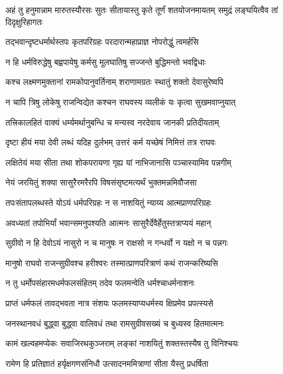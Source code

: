 \threelineshloka
{अहं तु हनुमान्नाम मारुतस्यौरसः सुतः}
{सीतायास्तु कृते तूर्णं शतयोजनमायतम्}
{समुद्रं लङ्घयित्वैव तां दिदृक्षुरिहागतः} %

\twolineshloka
{तद्भवान्दृष्टधर्मार्थस्तपः कृतपरिग्रहः}
{परदारान्महाप्राज्ञ नोपरोद्धुं त्वमर्हसि} %

\twolineshloka
{न हि धर्मविरुद्धेषु बह्वपायेषु कर्मसु}
{मूलघातिषु सज्जन्ते बुद्धिमन्तो भवद्विधाः} %

\twolineshloka
{कश्च लक्ष्मणमुक्तानां रामकोपानुवर्तिनाम्}
{शराणामग्रतः स्थातुं शक्तो देवासुरेष्वपि} %

\twolineshloka
{न चापि त्रिषु लोकेषु राजन्विद्येत कश्चन}
{राघवस्य व्यलीकं यः कृत्वा सुखमवाप्नुयात्} %

\twolineshloka
{तत्त्रिकालहितं वाक्यं धर्म्यमर्थानुबन्धि च}
{मन्यस्व नरदेवाय जानकी प्रतिदीयताम्} %

\twolineshloka
{दृष्टा हीयं मया देवी लब्धं यदिह दुर्लभम्}
{उत्तरं कर्म यच्छेषं निमित्तं तत्र राघवः} %

\twolineshloka
{लक्षितेयं मया सीता तथा शोकपरायणा}
{गृह्य यां नाभिजानासि पञ्चास्यामिव पन्नगीम्} %

\twolineshloka
{नेयं जरयितुं शक्या सासुरैरमरैरपि}
{विषसंसृष्टमत्यर्थं भुक्तमन्नमिवौजसा} %

\twolineshloka
{तपःसंतापलब्धस्ते योऽयं धर्मपरिग्रहः}
{न स नाशयितुं न्याय्य आत्मप्राणपरिग्रहः} %

\twolineshloka
{अवध्यतां तपोभिर्यां भवान्समनुपश्यति}
{आत्मनः सासुरैर्देवैर्हेतुस्तत्राप्ययं महान्} %

\twolineshloka
{सुग्रीवो न हि देवोऽयं नासुरो न च मानुषः}
{न राक्षसो न गन्धर्वो न यक्षो न च पन्नगः} %

\twolineshloka
{मानुषो राघवो राजन्सुग्रीवश्च हरीश्वरः}
{तस्मात्प्राणपरित्राणं कथं राजन्करिष्यसि} %

\twolineshloka
{न तु धर्मोपसंहारमधर्मफलसंहितम्}
{तदेव फलमन्वेति धर्मश्चाधर्मनाशनः} %

\twolineshloka
{प्राप्तं धर्मफलं तावद्भवता नात्र संशयः}
{फलमस्याप्यधर्मस्य क्षिप्रमेव प्रपत्स्यसे} %

\twolineshloka
{जनस्थानवधं बुद्ध्वा बुद्ध्वा वालिवधं तथा}
{रामसुग्रीवसख्यं च बुध्यस्व हितमात्मनः} %

\twolineshloka
{कामं खल्वहमप्येकः सवाजिरथकुञ्जराम्}
{लङ्कां नाशयितुं शक्तस्तस्यैष तु विनिश्चयः} %

\twolineshloka
{रामेण हि प्रतिज्ञातं हर्यृक्षगणसंनिधौ}
{उत्सादनममित्राणां सीता यैस्तु प्रधर्षिता} %

